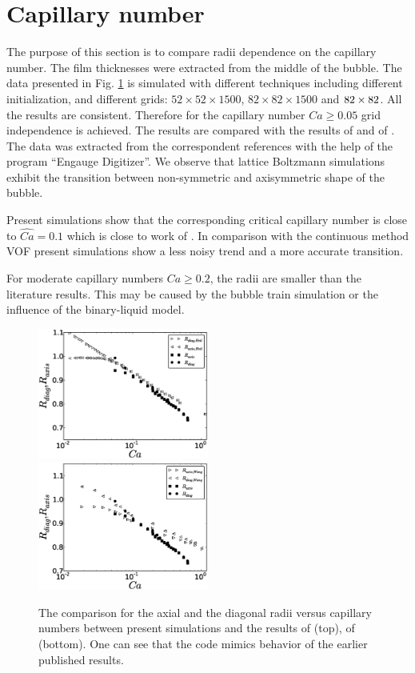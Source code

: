 \documentclass{article}
\begin{document}
\section{Capillary number}
The purpose of this section is to compare radii dependence on the capillary number. The film
thicknesses were extracted from the middle of the bubble. The data presented in Fig.
\ref{fig:capillary:comparison} is simulated with different techniques including different
initialization, and different grids: $52 \times 52 \times 1500$, $82 \times 82 \times 1500$ and $82
\times 82 \time 2400$. All the results are consistent. Therefore for the capillary number $Ca\geq
0.05$ grid independence is achieved. The results are compared with the results of
\citet{heil-threedim} and of \citet{wang-non-circular}. The data was extracted from the
correspondent references with the help of the program ``Engauge Digitizer''. We observe that
lattice Boltzmann simulations exhibit 
the transition between non-symmetric and axisymmetric shape of the bubble. 

Present simulations show that the corresponding critical capillary number is close to
$\widehat{Ca}=0.1$ which is close to work of \citet{wang-non-circular}. 
In comparison with
the continuous method VOF \cite{wang-non-circular} present simulations show a less noisy trend and
a more accurate transition. 

For moderate capillary numbers $Ca\geq 0.2$, the radii are smaller than the literature results. This
may be caused by the bubble train simulation or the influence of the binary-liquid model. 
\begin{figure}[ht]
\includegraphics[width=0.5\textwidth]{Figures/capillaries_comparison_heil.eps}
\includegraphics[width=0.5\textwidth]{Figures/capillaries_comparison_wang.eps}\\
\caption{The comparison for the axial and the diagonal radii
versus capillary numbers between present simulations and the results of \citet{heil-threedim}
(top), of \citet{wang-non-circular} (bottom). One can see that
the code mimics
behavior of the earlier published results.  \label{fig:capillary:comparison}} 
\end{figure}
\end{document}
